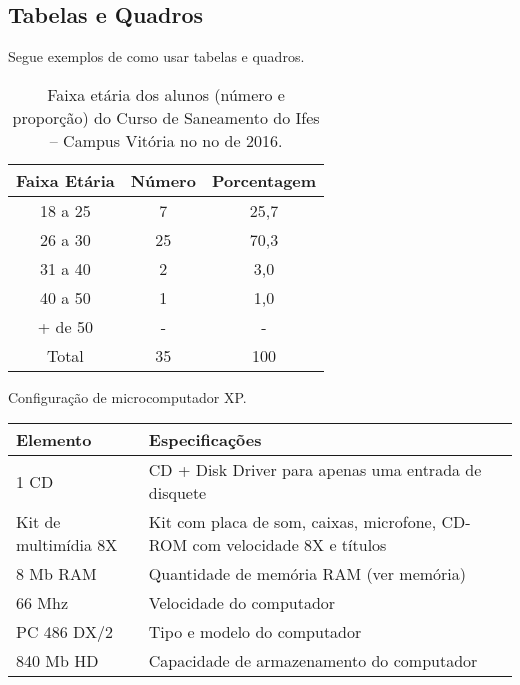 \subsection{Tabelas e Quadros}

Segue exemplos de como usar tabelas e quadros.

\begin{table}[ht]
  \caption{Faixa etária dos alunos (número e proporção) do Curso de Saneamento do Ifes – Campus Vitória no no de 2016.}
  \label{tab: table1}
  \centering

  \begin{tabular}{ccc}
    \hline
    \bfseries Faixa Etária & \bfseries Número & \bfseries Porcentagem\\
    \hline
    18 a 25 & 7 & 25,7 \\
    26 a 30 & 25 & 70,3 \\
    31 a 40 & 2 & 3,0 \\
    40 a 50 & 1 & 1,0 \\
    + de 50 & - & - \\
    \hline
    Total & 35 & 100 \\
    \hline
  \end{tabular}

  \source
\end{table}
  
\begin{quadro}[ht]
  \caption{Configuração de microcomputador XP.}
  \label{quad: quadro1}
  \centering
  
  \begin{tabularx}{\textwidth}{lX}
    \hline
    \bfseries Elemento & \bfseries Especificações\\
    \hline
    1 CD & CD + Disk Driver para apenas uma entrada de disquete \\
    Kit de multimídia 8X & Kit com placa de som, caixas, microfone, CD-ROM com velocidade 8X e títulos \\
    8 Mb RAM & Quantidade de memória RAM (ver memória) \\
    66 Mhz & Velocidade do computador \\
    PC 486 DX/2 & Tipo e modelo do computador \\
    840 Mb HD & Capacidade de armazenamento do computador \\
    \hline
  \end{tabularx}

\end{quadro}

